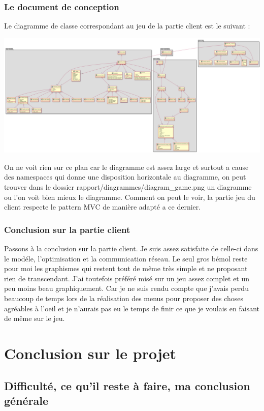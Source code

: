 \documentclass[12pt, openany]{report}
\begin{document}
    \section{Le document de conception}
	Le diagramme de classe correspondant au jeu de la partie client est le suivant : 

	\includegraphics[scale=0.15]{diagram_game.png}

	On ne voit rien sur ce plan car le diagramme est assez large et surtout a cause des namespaces qui donne une disposition horizontale au diagramme, on peut trouver dans le dossier rapport/diagrammes/diagram\_game.png un diagramme ou l'on voit bien mieux le diagramme. Comment on peut le voir, la partie jeu du client respecte le pattern MVC de manière adapté a ce dernier.
	
    \section{Conclusion sur la partie client}
Passons à la conclusion sur la partie client. Je suis assez satisfaite de celle-ci dans le modéle, l'optimisation et la communication réseau. Le seul gros bémol reste pour moi les graphismes qui restent tout de même très simple et ne proposant rien de transcendant. J'ai toutefois préféré misé sur un jeu assez complet et un peu moins beau graphiquement. Car je ne suis rendu compte que j'avais perdu beaucoup de temps lors de la réalisation des menus pour proposer des choses agréables à l'oeil et je n'aurais pas eu le temps de finir ce que je voulais en faisant de même sur le jeu.

\part{Conclusion sur le projet}
  \chapter{Difficulté, ce qu'il reste à faire, ma conclusion générale}
\end{document}
